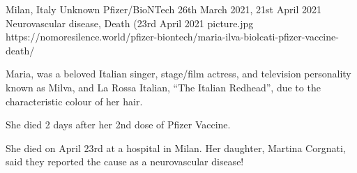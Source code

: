 {Milan, Italy}
{Unknown}
{Pfizer/BioNTech}
{26th March 2021, 21st April 2021}
{Neurovascular disease, Death (23rd April 2021}
{picture.jpg}
{https://nomoresilence.world/pfizer-biontech/maria-ilva-biolcati-pfizer-vaccine-death/}
{

Maria, was a beloved Italian singer, stage/film actress, and television
personality known as Milva, and La Rossa Italian, “The Italian Redhead”, due to
the characteristic colour of her hair.

She died 2 days after her 2nd dose of Pfizer Vaccine.

She died on April 23rd at a hospital in Milan. Her daughter, Martina Corgnati,
said they reported the cause as a neurovascular disease!

}
